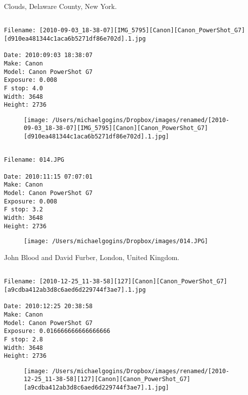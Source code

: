 \clearpage
\onecolumn
\noindent Clouds, Delaware County, New York.
\noindent
\begin{lstlisting}

Filename: [2010-09-03_18-38-07][IMG_5795][Canon][Canon_PowerShot_G7][d910ea481344c1aca6b5271df86e702d].1.jpg

Date: 2010:09:03 18:38:07
Make: Canon
Model: Canon PowerShot G7
Exposure: 0.008
F stop: 4.0
Width: 3648
Height: 2736
\end{lstlisting}
\clearpage

\begin{figure}
\texttt{[image: /Users/michaelgogins/Dropbox/images/renamed/[2010-09-03\_18-38-07][IMG\_5795][Canon][Canon\_PowerShot\_G7][d910ea481344c1aca6b5271df86e702d].1.jpg]}
\end{figure}
    
\clearpage
\onecolumn
\noindent 
\noindent
\begin{lstlisting}

Filename: 014.JPG

Date: 2010:11:15 07:07:01
Make: Canon
Model: Canon PowerShot G7
Exposure: 0.008
F stop: 3.2
Width: 3648
Height: 2736
\end{lstlisting}
\clearpage

\begin{figure}
\texttt{[image: /Users/michaelgogins/Dropbox/images/014.JPG]}
\end{figure}
    
\clearpage
\onecolumn
\noindent John Blood and David Furber, London, United Kingdom.
\noindent
\begin{lstlisting}

Filename: [2010-12-25_11-38-58][127][Canon][Canon_PowerShot_G7][a9cdba412ab3d8c6aed6d229744f3ae7].1.jpg

Date: 2010:12:25 20:38:58
Make: Canon
Model: Canon PowerShot G7
Exposure: 0.016666666666666666
F stop: 2.8
Width: 3648
Height: 2736
\end{lstlisting}
\clearpage

\begin{figure}
\texttt{[image: /Users/michaelgogins/Dropbox/images/renamed/[2010-12-25\_11-38-58][127][Canon][Canon\_PowerShot\_G7][a9cdba412ab3d8c6aed6d229744f3ae7].1.jpg]}
\end{figure}
    
